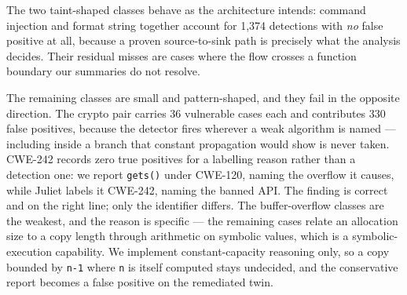\documentclass[10pt,conference]{IEEEtran}
\begin{document}
\begin{table}[t]
\centering
\caption{RQ2: per-CWE confusion counts on the unfiltered Juliet extraction (line-level detections beside case-level counts),
matched per case. Raw counts are given rather than ratios because several
classes have small denominators where a ratio would overstate confidence.
``Bound'' names the analysis capability the missed cases require.}
\label{tab:percwe}
\footnotesize
{}
\end{table}

The two taint-shaped classes behave as the architecture intends: command
injection and format string together account for 1{,}374 detections with
\emph{no} false positive at all, because a proven source-to-sink path is
precisely what the analysis decides. Their residual misses are cases where
the flow crosses a function boundary our summaries do not resolve.

The remaining classes are small and pattern-shaped, and they fail in the
opposite direction. The crypto pair carries 36 vulnerable cases each and
contributes 330 false positives, because the detector fires wherever a weak
algorithm is named --- including inside a branch that constant propagation
would show is never taken. CWE-242 records zero true positives for a
labelling reason rather than a detection one: we report \texttt{gets()} under
CWE-120, naming the overflow it causes, while Juliet labels it CWE-242, naming
the banned API. The finding is correct and on the right line; only the
identifier differs.
The buffer-overflow classes are the weakest, and the reason is specific ---
the remaining cases relate an allocation size to a copy length through
arithmetic on symbolic values, which is a symbolic-execution capability. We
implement constant-capacity reasoning only, so a copy bounded by
\texttt{n-1} where \texttt{n} is itself computed stays undecided, and the
conservative report becomes a false positive on the remediated twin.
\end{document}
